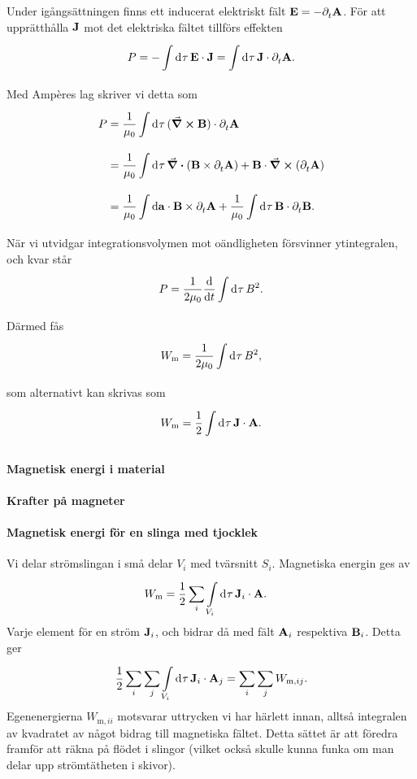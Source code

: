 Under igångsättningen finns ett inducerat elektriskt fält $\vb{E} = -\partial_{t}^{}\vb{A}$. För att upprätthålla $\vb{J}$ mot det elektriska fältet tillförs effekten
\begin{align*}
	P = -\int\limits_{}^{}\dd[]{\tau}\vb{E}\cdot\vb{J} = \int\limits_{}^{}\dd[]{\tau}\vb{J}\cdot\partial_{t}^{}\vb{A}.
\end{align*}
Med Ampères lag skriver vi detta som
\begin{align*}
	P &= \frac{1}{\mu_{0}}\int\limits_{}^{}\dd[]{\tau}(\curl{\vb{B}})\cdot\partial_{t}^{}\vb{A} \\
	  &= \frac{1}{\mu_{0}}\int\limits_{}^{}\dd[]{\tau}\div(\vb{B}\times\partial_{t}^{}\vb{A}) + \vb{B}\cdot\curl(\partial_{t}^{}\vb{A}) \\
	  &= \frac{1}{\mu_{0}}\int\limits_{}^{}\dd{\vb{a}}\cdot \vb{B}\times\partial_{t}^{}\vb{A} + \frac{1}{\mu_{0}}\int\limits_{}^{}\dd[]{\tau}\vb{B}\cdot\partial_{t}^{}\vb{B}.
\end{align*}
När vi utvidgar integrationsvolymen mot oändligheten försvinner ytintegralen, och kvar står
\begin{align*}
	P = \frac{1}{2\mu_{0}}\dv{t}\int\limits_{}^{}\dd[]{\tau}B^{2}.
\end{align*}
Därmed fås
\begin{align*}
	W_{\text{m}} = \frac{1}{2\mu_{0}}\int\limits_{}^{}\dd[]{\tau}B^{2},
\end{align*}
som alternativt kan skrivas som
\begin{align*}
	W_{\text{m}} = \frac{1}{2}\int\limits_{}^{}\dd[]{\tau}\vb{J}\cdot\vb{A}.
\end{align*}

\paragraph{Magnetisk energi i material}

\paragraph{Krafter på magneter}

\paragraph{Magnetisk energi för en slinga med tjocklek}
Vi delar strömslingan i små delar $V_{i}$ med tvärsnitt $S_{i}$. Magnetiska energin ges av
\begin{align*}
	W_{\text{m}} &= \frac{1}{2}\sum\limits_{i}\int\limits_{V_{i}}^{}\dd[]{\tau}\vb{J}_{i}\cdot\vb{A}.
\end{align*}
Varje element för en ström $\vb{J}_{i}$, och bidrar då med fält $\vb{A}_{i}$ respektiva $\vb{B}_{i}$. Detta ger
\begin{align*}
	\frac{1}{2}\sum\limits_{i}\sum\limits_{j}\int\limits_{V_{i}}^{}\dd[]{\tau}\vb{J}_{i}\cdot\vb{A}_{j} = \sum\limits_{i}\sum\limits_{j}W_{\text{m}, ij}.
\end{align*}
Egenenergierna $W_{\text{m}, ii}$ motsvarar uttrycken vi har härlett innan, alltså integralen av kvadratet av något bidrag till magnetiska fältet. Detta sättet är att föredra framför att räkna på flödet i slingor (vilket också skulle kunna funka om man delar upp strömtätheten i skivor).

